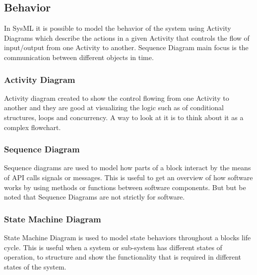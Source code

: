 \subsection{Behavior}\label{sc:behavior}
In SysML it is possible to model the behavior of the system using Activity Diagrams which describe the actions in a given Activity that controls the flow of input/output from one Activity to another. Sequence Diagram main focus is the communication between different objects in time. 

\subsubsection{Activity Diagram}\label{ssc:activitydiagram}
Activity diagram created to show the control flowing from one Activity to another and they are good at visualizing the logic such as of conditional structures, loops and concurrency. A way to look at it is to think about it as a complex flowchart.

\subsubsection{Sequence Diagram}\label{ssc:sequencediagram}
Sequence diagrams are used to model how parts of a block interact by the means of API calls signals or messages. This is useful to get an overview of how software works by using methods or functions between software components. But but be noted that Sequence Diagrams are not strictly for software.

\subsubsection{State Machine Diagram}\label{ssc:statemachinediagram}
State Machine Diagram is used to model state behaviors throughout a blocks life cycle. This is useful when a system or sub-system has different states of operation, to structure and show the functionality that is required in different states of the system.